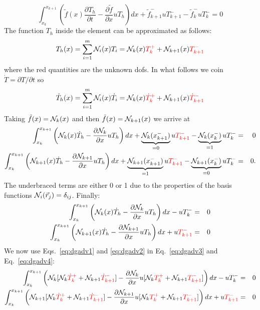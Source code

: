 \begin{equation}
\int_{x_k}^{x_{k+1}}\left(
\tilde{f}(x)\frac{\partial T_h}{\partial t}-
\frac{\partial \tilde{f}}{\partial x} uT_h \right) dx
+\tilde{f}_{k+1}^-uT_{k+1}^-     -\tilde{f}_{k}^-uT_{k}^-=0
\end{equation}
The function $T_h$ inside the element can be approximated 
as follows:
\begin{equation}
T_h(x) = \sum_{i=1}^m {\mathcal{N}}_i(x) T_i = 
{\mathcal{N}}_k(x) {\color{red}T_k^+} + {\mathcal{N}}_{k+1}(x) {\color{red}T_{k+1}^-}
\label{eq:dgadv1} 
\end{equation}
where the red quantities are the unknown dofs.
In what follows we coin $\dot{T}=\partial T/\partial t$ so
\begin{equation}
\dot{T}_h(x) 
= \sum_{i=1}^m {\mathcal{N}}_i(x) \dot{T}_i 
= {\mathcal{N}}_k(x) {\color{red}\dot{T}_k^+} + {\mathcal{N}}_{k+1}(x) {\color{red}\dot{T}_{k+1}^-}
\label{eq:dgadv2} 
\end{equation}
Taking $\tilde{f}(x)={\mathcal{N}}_k(x)$ and then $\tilde{f}(x)={\mathcal{N}}_{k+1}(x)$ we arrive at
\begin{eqnarray}
\int_{x_k}^{x_{k+1}}\left(
{\mathcal{N}}_k(x) \dot{T}_h -
\frac{\partial {\mathcal{N}}_k}{\partial x} uT_h \right) dx
+\underbrace{{\mathcal{N}}_k(x_{k+1}^-)}_{=0}u {\color{red}T_{k+1}^-}     - 
\underbrace{{\mathcal{N}}_k (x_{k}^-)}_{=1}uT_{k}^- &=& 0 \\
\int_{x_k}^{x_{k+1}}\left( {\mathcal{N}}_{k+1}(x) \dot{T}_h -
\frac{\partial {\mathcal{N}}_{k+1}}{\partial x} uT_h \right) dx
+ \underbrace{{\mathcal{N}}_{k+1}(x_{k+1}^-)}_{=1}u {\color{red}T_{k+1}^-}     -
\underbrace{{\mathcal{N}}_{k+1}(x_{k}^-)}_{=0}uT_{k}^- &=& 0.
\end{eqnarray}
The underbraced terms are either 0 or 1 due to the properties of the basis functions
${\mathcal{N}}_i(\vec{r}_j)=\delta_{ij}$. Finally:
\begin{eqnarray}
\int_{x_k}^{x_{k+1}}\left(
{\mathcal{N}}_k(x) \dot{T}_h -
\frac{\partial {\mathcal{N}}_k}{\partial x} uT_h \right) dx
   -  uT_{k}^- &=& 0 \label{eq:dgadv3}\\
\int_{x_k}^{x_{k+1}}\left(
{\mathcal{N}}_{k+1}(x)  \dot{T}_h -
\frac{\partial {\mathcal{N}}_{k+1}}{\partial x} uT_h \right) dx
+ u{\color{red} T_{k+1}^-}      &=& 0  \label{eq:dgadv4}
\end{eqnarray}
We now use Eqs.~\eqref{eq:dgadv1} and \eqref{eq:dgadv2} in Eq.~\eqref{eq:dgadv3} and Eq.~\eqref{eq:dgadv4}:
\begin{eqnarray}
\int_{x_k}^{x_{k+1}}\left(
{\mathcal{N}}_k
[{\mathcal{N}}_k {\color{red}\dot{T}_k^+} + {\mathcal{N}}_{k+1} {\color{red}\dot{T}_{k+1}^-}]
-
\frac{\partial {\mathcal{N}}_k}{\partial x} u
[{\mathcal{N}}_k {\color{red}T_k^+} + {\mathcal{N}}_{k+1} {\color{red}T_{k+1}^-}]
 \right) dx
   -  uT_{k}^- &=& 0 \\
\int_{x_k}^{x_{k+1}}\left(
{\mathcal{N}}_{k+1} 
[{\mathcal{N}}_k {\color{red}\dot{T}_k^+} + {\mathcal{N}}_{k+1} {\color{red}\dot{T}_{k+1}^-}]
 -
\frac{\partial {\mathcal{N}}_{k+1}}{\partial x} u
[{\mathcal{N}}_k {\color{red}T_k^+} + {\mathcal{N}}_{k+1} {\color{red}T_{k+1}^-}]
\right) dx
+ u{\color{red} T_{k+1}^-}      &=& 0
\end{eqnarray}
